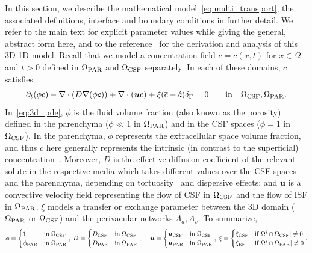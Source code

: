 In this section, we describe the mathematical
model~\eqref{eq:multi_transport}, the associated definitions,
interface and boundary conditions in further detail. We refer to the
main text for explicit parameter values while giving the general,
abstract form here, and to the reference~\cite{masri2023modelling} for
the derivation and analysis of this 3D-1D model. Recall that we model
a concentration field $c = c(x, t)$ for $x \in \Omega$ and $t > 0$
defined in $\Omega_{\rm PAR}$ and $\Omega_{\rm CSF}$ separately. In
each of these domains, $c$ satisfies
\begin{equation}
  \partial_t (\phi c) - \nabla \cdot (D \nabla (\phi c) ) + \nabla \cdot (\bm u c ) + \xi (\overline{c} - \hat c ) \delta_\Gamma
   = 0
  \quad \quad \mathrm{in} \quad \Omega_{\rm CSF}, \Omega_{\rm{PAR}}.
  \label{eq:3d_pde}
\end{equation}
In~\eqref{eq:3d_pde}, $\phi$ is the fluid volume fraction (also known as the porosity) defined in the parenchyma ($\phi \ll 1$ in $\Omega_{\rm PAR}$) and in the CSF spaces ($\phi = 1$ in $\Omega_{\rm CSF}$). In the parenchyma, $\phi$ represents the extracellular space volume fraction, and thus $c$ here generally represents the intrinsic (in contrast to the superficial) concentration~\cite{sykova2008diffusion}. Moreover, $D$ is the effective diffusion coefficient of the relevant solute in the respective media which takes different values over the CSF spaces and the parenchyma, depending on tortuosity~\cite{sykova2008diffusion} and dispersive effects; and $\bm u$ is a convective velocity field representing the flow of CSF in $\Omega_{\rm CSF}$ and the flow of ISF in $\Omega_{\rm PAR}$. $\xi$ models a transfer or exchange parameter between the 3D domain ($\Omega_{\rm PAR}$ or $\Omega_{\rm CSF}$) and the perivacular networks $\Lambda_a, \Lambda_v$. To summarize,
\begin{equation*}
\phi =  \begin{cases}
  1  & \mathrm{in} \;  \Omega_{\rm{CSF}} \\ 
  \phi_{\rm{PAR}} & \mathrm{in} \; \Omega_{\rm{PAR}} 
  \end{cases}, \; 
D = \begin{cases}
  D_{\rm{CSF}} & \mathrm{in} \;  \Omega_{\rm{CSF}} \\ 
  D_{\rm{PAR}} & \mathrm{in} \; \Omega_{\rm{PAR}} \end{cases}, \; 
  \quad \bm u  = \begin{cases}
  \bm{u}_{\rm{CSF}} & \mathrm{in} \; \Omega_{\rm{CSF}} \\ 
  \bm{u}_{\rm{PAR}} & \mathrm{in} \; \Omega_{\rm{PAR}} 
\end{cases}, \; 
\xi = \begin{cases}
  \xi_{\rm{CSF}} & \mathrm{if} |\Omega^i \cap \Omega_{\rm{CSF}}| \neq 0 \\
  \xi_{\rm{EF}} & \mathrm{if} |\Omega^i \cap \Omega_{\rm{PAR}}| \neq 0  
\end{cases} . 
\end{equation*}
